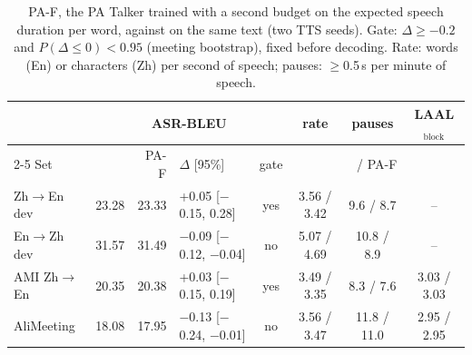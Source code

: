 \begin{table}[t]
\centering\scriptsize
\setlength{\tabcolsep}{2.5pt}
\begin{tabular}{lrrlcccc}
\toprule
 & \multicolumn{4}{c}{ASR-BLEU} & rate & pauses & LAAL$_\text{block}$ \\
\cmidrule(lr){2-5}
Set & \sys{} & PA-F & $\Delta$ [95\%] & gate & \multicolumn{3}{c}{\sys{} / PA-F} \\
\midrule
Zh$\rightarrow$En dev & 23.28 & 23.33 & +0.05 [$-$0.15, 0.28] & yes & 3.56 / 3.42 & 9.6 / 8.7 & -- \\
En$\rightarrow$Zh dev & 31.57 & 31.49 & $-$0.09 [$-$0.12, $-$0.04] & no & 5.07 / 4.69 & 10.8 / 8.9 & -- \\
\midrule
AMI Zh$\rightarrow$En & 20.35 & 20.38 & +0.03 [$-$0.15, 0.19] & yes & 3.49 / 3.35 & 8.3 / 7.6 & 3.03 / 3.03 \\
AliMeeting & 18.08 & 17.95 & $-$0.13 [$-$0.24, $-$0.01] & no & 3.56 / 3.47 & 11.8 / 11.0 & 2.95 / 2.95 \\
\bottomrule
\end{tabular}
\caption{PA-F, the PA Talker trained with a second budget on the expected speech duration per word, against \sys{} on the same text (two TTS seeds). Gate: $\Delta\ge-0.2$ and $P(\Delta\le0)<0.95$ (meeting bootstrap), fixed before decoding. Rate: words (En) or characters (Zh) per second of speech; pauses: $\ge$0.5\,s per minute of speech.}
\label{tab:fluencypa}
\end{table}

